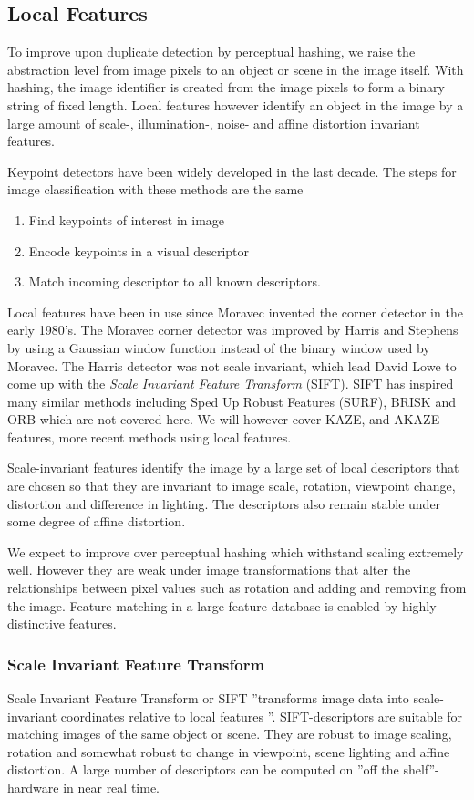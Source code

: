 \documentclass[english,12pt,a4paper,pdftex,elec,utf8, table]{aaltothesis}
\begin{document}
\subsection{Local Features}
To improve upon duplicate detection by perceptual hashing, we raise the abstraction level from image pixels to an object or scene in the image itself. With hashing, the image identifier is created from the image pixels to form a binary string of fixed length. Local features however identify an object in the image by a large amount of scale-, illumination-, noise- and affine distortion invariant features.

Keypoint detectors have been widely developed in the last decade. The steps for image classification with these methods are the same

\begin{enumerate}
\item Find keypoints of interest in image
\item Encode keypoints in a visual descriptor
\item Match incoming descriptor to all known descriptors.
\end{enumerate}

Local features have been in use since Moravec invented the corner detector in the early 1980's. The Moravec corner detector was improved by Harris and Stephens by using a Gaussian window function instead of the binary window used by Moravec. The Harris detector was not scale invariant, which lead David Lowe to come up with the \emph{Scale Invariant Feature Transform} (SIFT). SIFT has inspired many similar methods including Sped Up Robust Features (SURF), BRISK and ORB which are not covered here. We will however cover KAZE, and AKAZE features, more recent methods using local features.

Scale-invariant features identify the image by a large set of local descriptors that are chosen so that they are invariant to image scale, rotation, viewpoint change, distortion and difference in lighting. The descriptors also remain stable under some degree of affine distortion. \cite{Lowe2004}

We expect to improve over perceptual hashing which withstand scaling extremely well. However they are weak under image transformations that alter the relationships between pixel values such as rotation and adding and removing from the image. Feature matching in a large feature database is enabled by highly distinctive features.

\subsubsection{Scale Invariant Feature Transform} \label{SIFTSection}
Scale Invariant Feature Transform or SIFT ''transforms image data into scale-invariant coordinates relative to local features \cite{Lowe2004}''. SIFT-descriptors are suitable for matching images of the same object or scene. They are robust to image scaling, rotation and somewhat robust to change in viewpoint, scene lighting and affine distortion. A large number of descriptors can be computed on ''off the shelf''-hardware in near real time. \cite{Lowe2004}
\end{document}
